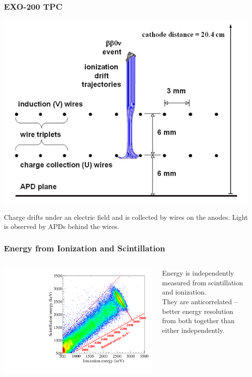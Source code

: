 \documentclass{beamer}
\begin{document}
\begin{frame}
\begin{center}
\frametitle{EXO-200 TPC}
\end{center}
\vspace{1cm}
\begin{center}
\includegraphics[keepaspectratio=true,width=.8\textwidth]{ChargeDrift2DModel.png}
\end{center}
Charge drifts under an electric field and is collected by wires on the anodes.  Light is observed by APDs behind the wires.
\end{frame}

\begin{frame}
\begin{center}
\frametitle{Energy from Ionization and Scintillation}
\end{center}
\begin{columns}
\begin{column}{.75\textwidth}
\includegraphics[keepaspectratio=true,width=\textwidth]{RotationTh2D_withCalibration.pdf}
\end{column}
\begin{column}{.25\textwidth}
Energy is independently measured from scintillation and ionization.\\[\baselineskip]

They are anticorrelated -- better energy resolution from both together than either independently.
\end{column}
\end{columns}
\end{frame}
\end{document}
